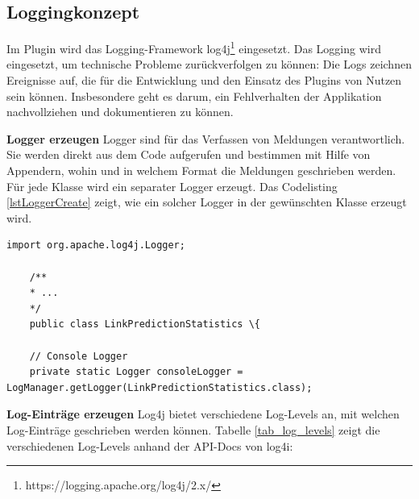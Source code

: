 \subsection{Loggingkonzept}
\label{loggingkonzept}

Im Plugin wird das Logging-Framework log4j\footnote{https://logging.apache.org/log4j/2.x/} eingesetzt.
Das Logging wird eingesetzt, um technische Probleme zurückverfolgen zu können: Die Logs zeichnen Ereignisse auf, die für die Entwicklung und den Einsatz des Plugins von Nutzen sein können.
Insbesondere geht es darum, ein Fehlverhalten der Applikation nachvollziehen und dokumentieren zu können.

\textbf{Logger erzeugen}
Logger sind für das Verfassen von Meldungen verantwortlich. Sie werden direkt aus dem Code aufgerufen und bestimmen mit Hilfe von Appendern, wohin und in welchem Format die Meldungen geschrieben werden.
Für jede Klasse wird ein separater Logger erzeugt. Das Codelisting \ref{lstLoggerCreate} zeigt, wie ein solcher Logger in der gewünschten Klasse erzeugt wird.

\begin{lstlisting}[caption={Erzeugen eines Loggers},label=lstLoggerCreate]
    import org.apache.log4j.Logger;

    /**
    * ...
    */
    public class LinkPredictionStatistics \{

    // Console Logger
    private static Logger consoleLogger = LogManager.getLogger(LinkPredictionStatistics.class);
\end{lstlisting}

\textbf{Log-Einträge erzeugen}
Log4j bietet verschiedene Log-Levels an, mit welchen Log-Einträge geschrieben werden können.
Tabelle \ref{tab_log_levels} zeigt die verschiedenen Log-Levels anhand der \acs{API}-Docs von log4i:

